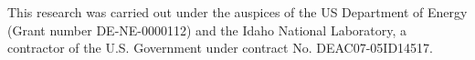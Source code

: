 This research was carried out under the auspices of the US Department of Energy  (Grant number DE-NE-0000112) and the Idaho National Laboratory, a contractor of the U.S. Government under contract No. DEAC07-05ID14517. 
